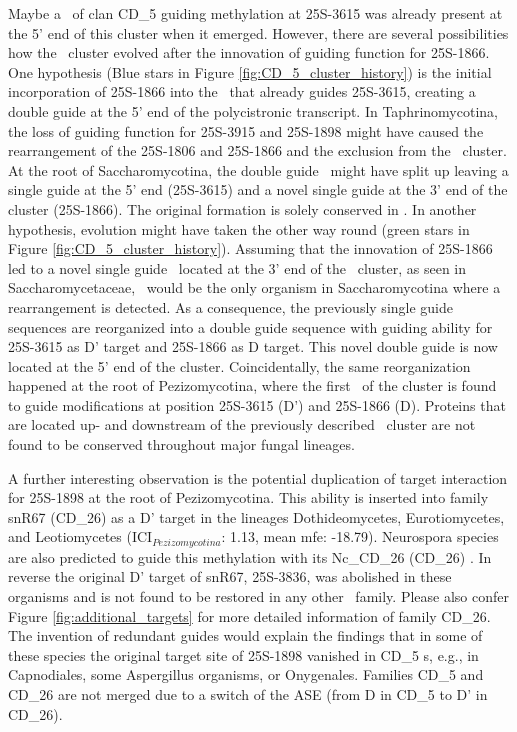 Maybe a \sno\ of clan CD\_5 guiding methylation at 25S-3615 was already
present at the 5' end of this cluster when it emerged. However, there are
several possibilities how the \sno\ cluster evolved after the innovation of
guiding function for 25S-1866.  One hypothesis (Blue stars in Figure
\ref{fig:CD_5_cluster_history}) is the initial incorporation of 25S-1866
into the \sno\ that already guides 25S-3615, creating a double guide \sno
at the 5' end of the polycistronic transcript. In Taphrinomycotina, the
loss of guiding function for 25S-3915 and 25S-1898 might have caused the
rearrangement of the 25S-1806 and 25S-1866 and the exclusion from the \sno\
cluster. At the root of Saccharomycotina, the double guide \sno\ might have
split up leaving a single guide at the 5' end (25S-3615) and a novel single
guide at the 3' end of the cluster (25S-1866). The original formation is
solely conserved in \Yli. In another hypothesis, evolution might have taken
the other way round (green stars in Figure
\ref{fig:CD_5_cluster_history}). Assuming that the innovation of 25S-1866
led to a novel single guide \sno\ located at the 3' end of the \sno\
cluster, as seen in Saccharomycetaceae, \yli\ would be the only organism in
Saccharomycotina where a rearrangement is detected. As a consequence, the
previously single guide sequences are reorganized into a double guide
sequence with guiding ability for 25S-3615 as D' target and 25S-1866 as D
target. This novel double guide is now located at the 5' end of the
cluster.  Coincidentally, the same reorganization happened at the root of
Pezizomycotina, where the first \sno\ of the cluster is found to guide
modifications at position 25S-3615 (D') and 25S-1866 (D). Proteins that are
located up- and downstream of the previously described \sno\ cluster are
not found to be conserved throughout major fungal lineages.

A further interesting observation is the potential duplication of
target interaction for 25S-1898 at the root of Pezizomycotina. This
ability is inserted into family snR67 (CD\_26) as a D' target in the
lineages Dothideomycetes, Eurotiomycetes, and Leotiomycetes
(ICI$_{Pezizomycotina}$: 1.13, mean mfe: -18.79). Neurospora species
are also predicted to guide this methylation with its Nc\_CD\_26
(CD\_26) \sno \cite{Liu:2009}. In reverse the original D' target of
snR67, 25S-3836, was abolished in these organisms and is not found to
be restored in any other \sno\ family.  Please also confer Figure
\ref{fig:additional_targets} for more detailed information of family
CD\_26. The invention of redundant guides would explain the findings
that in some of these species the original target site of 25S-1898
vanished in CD\_5 \sno s, e.g., in Capnodiales, some Aspergillus
organisms, or Onygenales. Families CD\_5 and CD\_26 are not merged due
to a switch of the ASE (from D in CD\_5 to D' in CD\_26).  

